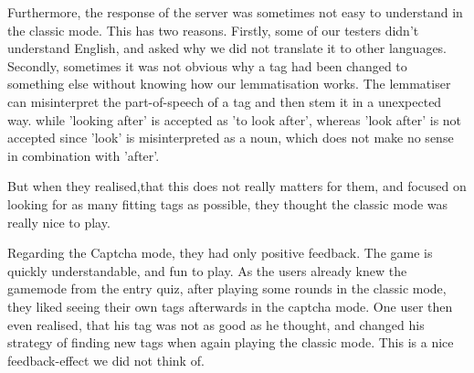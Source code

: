 Furthermore, the response of the server was sometimes not easy to understand in the classic mode.
This has two reasons.
Firstly, some of our testers didn't understand English, and asked why we did not translate it to other languages.
Secondly, sometimes it was not obvious why a tag had been changed to something else without knowing how our lemmatisation works.
The lemmatiser can misinterpret the part-of-speech of a tag and then stem it in a unexpected way.
while 'looking after' is accepted as 'to look after', whereas 'look after' is not accepted since 'look' is misinterpreted as a noun, which does not make no sense in combination with 'after'.

But when they realised,that this does not really matters for them, and focused on looking for as many fitting tags as possible, they thought the classic mode was really nice to play.

Regarding the Captcha mode, they had only positive feedback. The game is quickly understandable, and fun to play.
As the users already knew the gamemode from the entry quiz, after playing some rounds in the classic mode, they liked seeing their own tags afterwards in the captcha mode.
One user then even realised, that his tag was not as good as he thought, and changed his strategy of finding new tags when again playing the classic mode.
This is a nice feedback-effect we did not think of.
